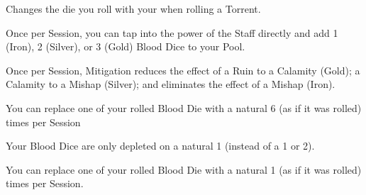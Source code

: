 {

Changes the die you roll with your \INT when rolling a Torrent. 


Once per Session, you can tap into the power of the Staff directly and add 1 (Iron), 2 (Silver), or 3 (Gold) Blood Dice to your Pool.


Once per Session, Mitigation reduces the effect of a Ruin to a Calamity (Gold); a Calamity to a Mishap (Silver); and eliminates the effect of a Mishap (Iron).


You can replace one of your rolled Blood Die with a natural 6 (as if it was rolled) \mybold{[num]} times per Session  


Your Blood Dice are only depleted on a natural 1 (instead of a 1 or 2). 


You can replace one of your rolled Blood Die with a natural 1 (as if it was rolled) \mybold{[num]} times per Session.





}%
